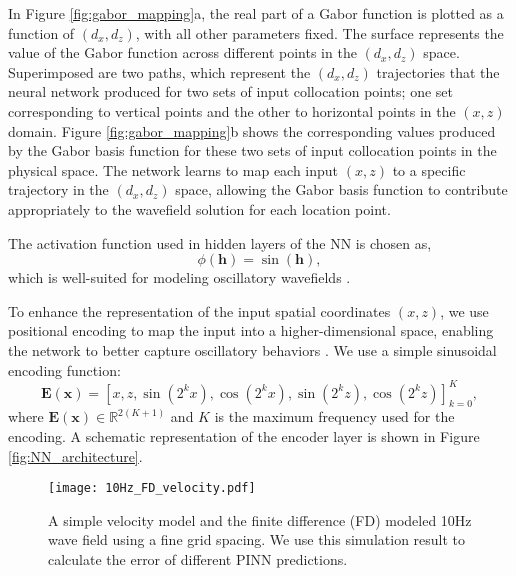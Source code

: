 \documentclass[authoryear, preprint, 12pt]{elsarticle}
\begin{document}
	In Figure \ref{fig:gabor_mapping}a, the real part of a Gabor function is plotted as a function of \( (d_x, d_z) \), with all other parameters fixed. The surface represents the value of the Gabor function across different points in the \( (d_x, d_z) \) space. Superimposed are two paths, which represent the \( (d_x, d_z) \) trajectories that the neural network produced for two sets of input collocation points; one set corresponding to vertical points and the other to horizontal points in the \( (x, z) \) domain. Figure \ref{fig:gabor_mapping}b shows the corresponding values produced by the Gabor basis function for these two sets of input collocation points in the physical space. The network learns to map each input \( (x, z) \) to a specific trajectory in the \( (d_x, d_z) \) space, allowing the Gabor basis function to contribute appropriately to the wavefield solution for each location point.
	
	The activation function used in hidden layers of the NN is chosen as,
	\begin{equation}
		\phi(\mathbf{h}) = \sin(\mathbf{h}),
	\end{equation}
	which is well-suited for modeling oscillatory wavefields \citep{huang2021,wong2022learning,song2022versatile,buzaev2024hybrid}.
	
	To enhance the representation of the input spatial coordinates \( (x, z) \), we use positional encoding to map the input into a higher-dimensional space, enabling the network to better capture oscillatory behaviors \citep{Vaswani2017, huang2021}. We use a simple sinusoidal encoding function:
	\begin{equation}
		\mathbf{E}(\mathbf{x}) = \left[x,z, \sin(2^k x), \cos(2^k x), \sin(2^k z), \cos(2^k z) \right]_{k=0}^{K},
		\label{eq:encoder}
	\end{equation}
	where \( \mathbf{E}(\mathbf{x}) \in \mathbb{R}^{2(K+1)} \) and \( K \) is the maximum frequency used for the encoding. A schematic representation of the encoder layer is shown in Figure \ref{fig:NN_architecture}. 
	
	\begin{figure}[]
		\centering
		\texttt{[image: 10Hz\_FD\_velocity.pdf]}  
		\caption{A simple velocity model and the finite difference (FD) modeled 10Hz wave field using a fine grid spacing. We use this simulation result to calculate the error of different PINN predictions. }
		\label{fig:10Hz_fd_wavefoeld}
	\end{figure}
	
\end{document}
